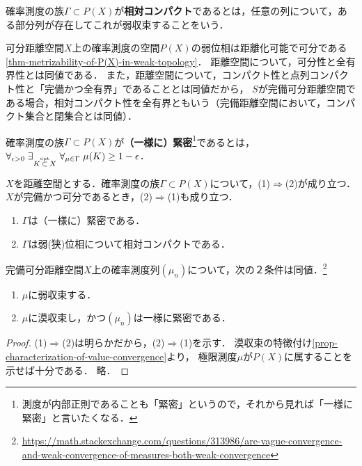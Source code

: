 \documentclass[uplatex,dvipdfmx]{jsreport}
\begin{document}
\begin{definition}
    確率測度の族$\Gamma\subset P(X)$が\textbf{相対コンパクト}であるとは，任意の列について，ある部分列が存在してこれが弱収束することをいう．
\end{definition}
\begin{remarks}
    可分距離空間$X$上の確率測度の空間$P(X)$の弱位相は距離化可能で可分である\ref{thm-metrizability-of-P(X)-in-weak-topology}．
    距離空間について，可分性と全有界性とは同値である．
    また，距離空間について，コンパクト性と点列コンパクト性と「完備かつ全有界」であることとは同値だから，
    $S$が完備可分距離空間である場合，相対コンパクト性を全有界ともいう（完備距離空間において，コンパクト集合と閉集合とは同値）．
\end{remarks}

\begin{definition}
    確率測度の族$\Gamma\subset P(X)$が\textbf{（一様に）緊密}\footnote{測度が内部正則であることも「緊密」というので，それから見れば「一様に緊密」と言いたくなる．}であるとは，
    $\forall_{\epsilon>0}\;\exists_{K\overset{\text{cpt}}{\subset} X}\;\forall_{\mu\in\Gamma}\;\mu(K)\ge 1-\epsilon$．
\end{definition}

\begin{theorem}
    $X$を距離空間とする．確率測度の族$\Gamma\subset P(X)$について，(1)$\Rightarrow$(2)が成り立つ．
    $X$が完備かつ可分であるとき，(2)$\Rightarrow$(1)も成り立つ．
    \begin{enumerate}
        \item  $\Gamma$は（一様に）緊密である．
        \item $\Gamma$は弱(狭)位相について相対コンパクトである．
    \end{enumerate}
\end{theorem}

\begin{corollary}[漠収束の特徴付け]
    完備可分距離空間$X$上の確率測度列$(\mu_n)$について，次の２条件は同値．\footnote{\url{https://math.stackexchange.com/questions/313986/are-vague-convergence-and-weak-convergence-of-measures-both-weak-convergence}}
    \begin{enumerate}
        \item $\mu$に弱収束する．
        \item $\mu$に漠収束し，かつ$(\mu_n)$は一様に緊密である．
    \end{enumerate}
\end{corollary}
\begin{proof}
    (1)$\Rightarrow$(2)は明らかだから，(2)$\Rightarrow$(1)を示す．
    漠収束の特徴付け\ref{prop-characterization-of-value-convergence}より，
    極限測度$\mu$が$P(X)$に属することを示せば十分である．
    略．
\end{proof}
\end{document}

